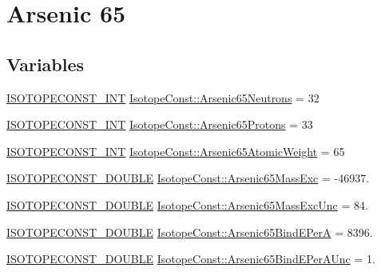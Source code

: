 \hypertarget{group___isotope_const-_arsenic-_as65}{}\section{Arsenic 65}
\label{group___isotope_const-_arsenic-_as65}
\subsection*{Variables}
\begin{DoxyCompactItemize}
\item 
\mbox{\hyperlink{group___isotope_const-_macros_ga5f18360b3e99483a35c32d789e62621c}{I\+S\+O\+T\+O\+P\+E\+C\+O\+N\+S\+T\+\_\+\+I\+NT}} \mbox{\hyperlink{group___isotope_const-_arsenic-_as65_ga840042bee347dadd051a3ce0ebc6e340}{Isotope\+Const\+::\+Arsenic65\+Neutrons}} = 32
\item 
\mbox{\hyperlink{group___isotope_const-_macros_ga5f18360b3e99483a35c32d789e62621c}{I\+S\+O\+T\+O\+P\+E\+C\+O\+N\+S\+T\+\_\+\+I\+NT}} \mbox{\hyperlink{group___isotope_const-_arsenic-_as65_gabe395909588b354a7aff170bdf588181}{Isotope\+Const\+::\+Arsenic65\+Protons}} = 33
\item 
\mbox{\hyperlink{group___isotope_const-_macros_ga5f18360b3e99483a35c32d789e62621c}{I\+S\+O\+T\+O\+P\+E\+C\+O\+N\+S\+T\+\_\+\+I\+NT}} \mbox{\hyperlink{group___isotope_const-_arsenic-_as65_ga5bd5c5e0cf44c606674f719273b10c09}{Isotope\+Const\+::\+Arsenic65\+Atomic\+Weight}} = 65
\item 
\mbox{\hyperlink{group___isotope_const-_macros_ga8f45a7272ce02c0b4c65c44636ed719a}{I\+S\+O\+T\+O\+P\+E\+C\+O\+N\+S\+T\+\_\+\+D\+O\+U\+B\+LE}} \mbox{\hyperlink{group___isotope_const-_arsenic-_as65_ga416fed6c282a29e33e7dbb8d1de1c8a7}{Isotope\+Const\+::\+Arsenic65\+Mass\+Exc}} = -\/46937.
\item 
\mbox{\hyperlink{group___isotope_const-_macros_ga8f45a7272ce02c0b4c65c44636ed719a}{I\+S\+O\+T\+O\+P\+E\+C\+O\+N\+S\+T\+\_\+\+D\+O\+U\+B\+LE}} \mbox{\hyperlink{group___isotope_const-_arsenic-_as65_ga4993ae022a58b07164e3c4afc493ecfa}{Isotope\+Const\+::\+Arsenic65\+Mass\+Exc\+Unc}} = 84.
\item 
\mbox{\hyperlink{group___isotope_const-_macros_ga8f45a7272ce02c0b4c65c44636ed719a}{I\+S\+O\+T\+O\+P\+E\+C\+O\+N\+S\+T\+\_\+\+D\+O\+U\+B\+LE}} \mbox{\hyperlink{group___isotope_const-_arsenic-_as65_gae7dca58cdc464eb018ceb739cf511cd3}{Isotope\+Const\+::\+Arsenic65\+Bind\+E\+PerA}} = 8396.
\item 
\mbox{\hyperlink{group___isotope_const-_macros_ga8f45a7272ce02c0b4c65c44636ed719a}{I\+S\+O\+T\+O\+P\+E\+C\+O\+N\+S\+T\+\_\+\+D\+O\+U\+B\+LE}} \mbox{\hyperlink{group___isotope_const-_arsenic-_as65_ga04ac2e9864906675b1be487e093d3692}{Isotope\+Const\+::\+Arsenic65\+Bind\+E\+Per\+A\+Unc}} = 1.

\end{DoxyCompactItemize}
